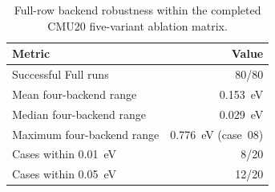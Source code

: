 \documentclass[%
 preprint,
 superscriptaddress,
 amsmath,amssymb,
 aps,
 prb,
 floatfix,
]{revtex4-2}
\begin{document}

\begin{table}[t]
\centering
\caption{Full-row backend robustness within the completed CMU20 five-variant ablation matrix.}
\label{tab:cmu20-full-completion}
\begin{tabular}{lr}
\toprule
Metric & Value \\
\midrule
Successful Full runs & 80/80 \\
Mean four-backend range & 0.153~eV \\
Median four-backend range & 0.029~eV \\
Maximum four-backend range & 0.776~eV (case~08) \\
Cases within 0.01~eV & 8/20 \\
Cases within 0.05~eV & 12/20 \\
\bottomrule
\end{tabular}
\end{table}
\end{document}
